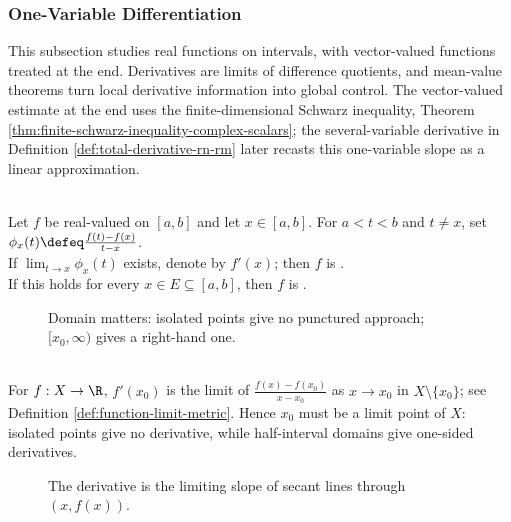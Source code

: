 \subsubsection{One-Variable Differentiation}

This subsection studies real functions on intervals, with vector-valued functions treated at the end. Derivatives are limits of difference quotients, and mean-value theorems turn local derivative information into global control. The vector-valued estimate at the end uses the finite-dimensional Schwarz inequality, Theorem \ref{thm:finite-schwarz-inequality-complex-scalars}; the several-variable derivative in Definition \ref{def:total-derivative-rn-rm} later recasts this one-variable slope as a linear approximation.

\begin{definition} \label{def:derivative-real-function}\label{def:one-variable-differentiation-core-source-todo} \\
Let $f$ be real-valued on $[a,b]$ and let $x\in[a,b]$. For $a<t<b$ and $t\neq x$, set $\phi_x(t)\defeq\frac{f(t)-f(x)}{t-x}$.\\
If $\lim_{t\to x}\phi_x(t)$ exists, denote  by $f'(x)$; then $f$ is .\\
If this holds for every $x\in E\subseteq[a,b]$, then $f$ is .
\end{definition}

\begin{figure}[H]
  \centering
  
  \caption{Domain matters: isolated points give no punctured approach; $[x_0,\infty)$ gives a right-hand one.}
  \label{fig:one-variable-domain-restriction}
\end{figure}

\begin{perspective} \label{per:one-variable-domain-of-differentiability} \\
For $f:X\to\R$, $f'(x_0)$ is the limit of $\frac{f(x)-f(x_0)}{x-x_0}$ as $x\to x_0$ in $X\setminus\{x_0\}$; see Definition \ref{def:function-limit-metric}. Hence $x_0$ must be a limit point of $X$: isolated points give no derivative, while half-interval domains give one-sided derivatives.
\end{perspective}

\begin{figure}[H]
  \centering
  
  \caption{The derivative is the limiting slope of secant lines through $(x,f(x))$.}
  \label{fig:derivative-secant-to-tangent}
\end{figure}

